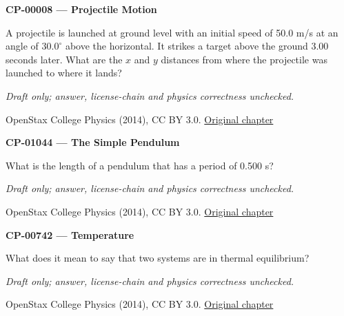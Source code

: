 \par\medskip
\noindent\textbf{CP-00008 — Projectile Motion}
\par A projectile is launched at ground level with an initial speed of 50.0 m/s at an angle of $30.0^{\circ}$ above the horizontal. It strikes a target above the ground 3.00 seconds later. What are the $x$ and $y$ distances from where the projectile was launched to where it lands?
\par\smallskip
\textit{Draft only; answer, license-chain and physics correctness unchecked.}
\par{\footnotesize OpenStax College Physics (2014), CC BY 3.0. \href{https://github.com/philschatz/physics-book/blob/a7efaa7e221fab1694022d8bb98b83a73ee31d3d/contents/m42042.md}{Original chapter}}\par\normalsize

\par\medskip
\noindent\textbf{CP-01044 — The Simple Pendulum}
\par What is the length of a pendulum that has a period of 0.500 s?
\par\smallskip
\textit{Draft only; answer, license-chain and physics correctness unchecked.}
\par{\footnotesize OpenStax College Physics (2014), CC BY 3.0. \href{https://github.com/philschatz/physics-book/blob/a7efaa7e221fab1694022d8bb98b83a73ee31d3d/contents/m42243.md}{Original chapter}}\par\normalsize

\par\medskip
\noindent\textbf{CP-00742 — Temperature}
\par What does it mean to say that two systems are in thermal equilibrium?
\par\smallskip
\textit{Draft only; answer, license-chain and physics correctness unchecked.}
\par{\footnotesize OpenStax College Physics (2014), CC BY 3.0. \href{https://github.com/philschatz/physics-book/blob/a7efaa7e221fab1694022d8bb98b83a73ee31d3d/contents/m42214.md}{Original chapter}}\par\normalsize

